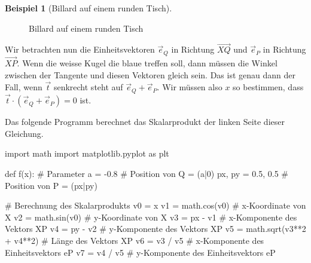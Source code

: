 \documentclass[
  a4paper,
  DIV=11]{scrreprt}
\newenvironment{Shaded}{\begin{snugshade}}{\end{snugshade}}
\newcommand{\CommentTok}[1]{\textcolor[rgb]{0.37,0.37,0.37}{#1}}
\newcommand{\DecValTok}[1]{\textcolor[rgb]{0.68,0.00,0.00}{#1}}
\newcommand{\FloatTok}[1]{\textcolor[rgb]{0.68,0.00,0.00}{#1}}
\newcommand{\ImportTok}[1]{\textcolor[rgb]{0.00,0.46,0.62}{#1}}
\newcommand{\KeywordTok}[1]{\textcolor[rgb]{0.00,0.23,0.31}{#1}}
\newcommand{\NormalTok}[1]{\textcolor[rgb]{0.00,0.23,0.31}{#1}}
\newcommand{\OperatorTok}[1]{\textcolor[rgb]{0.37,0.37,0.37}{#1}}
\theoremstyle{definition}
\theoremstyle{definition}
\newtheorem{example}{Beispiel}[chapter]
\theoremstyle{remark}
\begin{document}
\begin{example}[Billard auf einem runden
Tisch]
\begin{figure}[H]
{}

\caption{Billard auf einem runden Tisch}

\end{figure}

Wir betrachten nun die Einheitsvektoren \(\vec{e}_Q\) in Richtung
\(\overrightarrow{XQ}\) und \(\vec{e}_P\) in Richtung
\(\overrightarrow{XP}\). Wenn die weisse Kugel die blaue treffen soll,
dann müssen die Winkel zwischen der Tangente und diesen Vektoren gleich
sein. Das ist genau dann der Fall, wenn \(\vec{t}\) senkrecht steht auf
\(\vec{e}_Q + \vec{e}_P\). Wir müssen also \(x\) so bestimmen, dass
\(\vec{t} \cdot (\vec{e}_Q + \vec{e}_P) = 0\) ist.

Das folgende Programm berechnet das Skalarprodukt der linken Seite
dieser Gleichung.

\begin{Shaded}
\begin{Highlighting}[]
\ImportTok{import}\NormalTok{ math}
\ImportTok{import}\NormalTok{ matplotlib.pyplot }\ImportTok{as}\NormalTok{ plt}

\KeywordTok{def}\NormalTok{ f(x):}
    \CommentTok{\# Parameter}
\NormalTok{    a }\OperatorTok{=} \OperatorTok{{-}}\FloatTok{0.8}           \CommentTok{\# Position von Q = (a|0)}
\NormalTok{    px, py }\OperatorTok{=} \FloatTok{0.5}\NormalTok{, }\FloatTok{0.5}  \CommentTok{\# Position von P = (px|py)}

    \CommentTok{\# Berechnung des Skalarprodukts}
\NormalTok{    v0 }\OperatorTok{=}\NormalTok{ x}
\NormalTok{    v1 }\OperatorTok{=}\NormalTok{ math.cos(v0)  }\CommentTok{\# x{-}Koordinate von X}
\NormalTok{    v2 }\OperatorTok{=}\NormalTok{ math.sin(v0)  }\CommentTok{\# y{-}Koordinate von X}
\NormalTok{    v3 }\OperatorTok{=}\NormalTok{ px }\OperatorTok{{-}}\NormalTok{ v1       }\CommentTok{\# x{-}Komponente des Vektors XP}
\NormalTok{    v4 }\OperatorTok{=}\NormalTok{ py }\OperatorTok{{-}}\NormalTok{ v2       }\CommentTok{\# y{-}Komponente des Vektors XP}
\NormalTok{    v5 }\OperatorTok{=}\NormalTok{ math.sqrt(v3}\OperatorTok{**}\DecValTok{2} \OperatorTok{+}\NormalTok{ v4}\OperatorTok{**}\DecValTok{2}\NormalTok{)  }\CommentTok{\# Länge des Vektors XP}
\NormalTok{    v6 }\OperatorTok{=}\NormalTok{ v3 }\OperatorTok{/}\NormalTok{ v5       }\CommentTok{\# x{-}Komponente des Einheitsvektors eP}
\NormalTok{    v7 }\OperatorTok{=}\NormalTok{ v4 }\OperatorTok{/}\NormalTok{ v5       }\CommentTok{\# y{-}Komponente des Einheitsvektors eP}
    

\end{Highlighting}
\end{Shaded}
\end{example}
\end{document}
